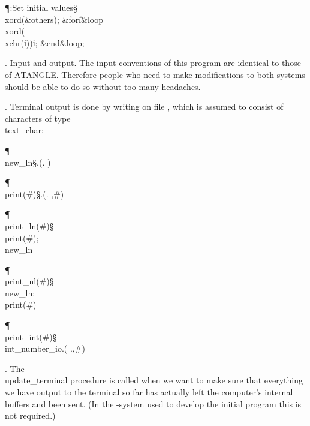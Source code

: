 \Y\P\?\4:Set initial values\X\mathrel{+}\S\?\6
\\{xord}\?\K\1(\?\&{others}\?\8\KR{}\2)\?;\6
\1\&{for}\8\|i\?\in{}\?\to{}\?\8\&{loop}\6
\\{xord}\?\1(\?\\{xchr}\?\1(\?\|i\?\2)\2)\K\?\|i;\2\6
\&{end}\8\&{loop};\par
\fi

.  Input and output.
The input conventions of this program are identical to those of \.{ATANGLE}.
Therefore people who need to make modifications to both systems
should be able to do so without too many headaches.

\fi

. Terminal output is done by writing on file , which is
assumed to consist of characters of type \\{text\_char}:

\Y\P\4\D\\{new\_ln}\?\S\?\?.\?\?\1(\?\?.\?%
\?\2)\6
\?\par
\P\4\D\\{print}\?\1(\?\#\?\2)\S\?\?.\?\?\1(\?\?.%
\?\?,\?\#\?\2)\6
\?\par
\P\4\D\\{print\_ln}\?\1(\?\#\?\2)\S\?\\{print}\?\1(\?\#\?\2)\?; \\{new\_ln}\?%
\6
\?\par
\P\4\D\\{print\_nl}\?\1(\?\#\?\2)\S\?\\{new\_ln}; \\{print}\?\1(\?\#\?\2)%
\6
\?\par
\P\4\D\\{print\_int}\?\1(\?\#\?\2)\S\?\\{int\_number\_io}\?.\?\?\1(\?%
\?.\?\?,\?\#\?\2)\6
\?\par
\fi

. The \\{update\_terminal} procedure is called when we want
to make sure that everything we have output to the terminal so far has
actually left the computer's internal buffers and been sent.
(In the \ADA-system used to develop the initial program this is not
required.)

